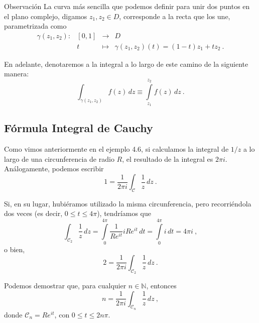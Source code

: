 \begin{obs}{Observación}
    La curva más sencilla que podemos definir para unir dos puntos en el plano complejo, digamos $z_1, z_2 \in D$, corresponde a la recta que los une, parametrizada como 
    \begin{equation}
        \begin{array}{crcl}
            \gamma(z_1, z_2): & [0,1] & \to & D \\
            & t & \mapsto & \gamma(z_1, z_2)(t) = (1-t)z_1 + tz_2 \ .
        \end{array}
    \end{equation}

    En adelante, denotaremos a la integral a lo largo de este camino de la siguiente manera:
    \begin{equation}
        \int_{\gamma(z_1, z_2)} f(z) \, dz \equiv \int\limits_{z_1}^{z_2} f(z) \, dz \ .
    \end{equation}
\end{obs}

\subsection{Fórmula Integral de Cauchy}

Como vimos anteriormente en el ejemplo 4.6, si calculamos la integral de $1/z$ a lo largo de una circunferencia de radio $R$, el resultado de la integral es $2 \pi i$. Análogamente, podemos escribir 
\begin{equation*}
    1 = \frac{1}{2\pi i} \int_{\mathcal{C}} \frac{1}{z} \, dz \ .
\end{equation*} 

Si, en su lugar, hubiéramos utilizado la misma circunferencia, pero recorriéndola dos veces (es decir, $0 \leq t \leq 4\pi$), tendríamos que
\begin{equation*}
    \int_{\mathcal{C}_2} \frac{1}{z} \, dz = \int\limits_0^{4\pi} \frac{1}{Re^{it}} i Re^{it} \, dt = \int\limits_0^{4\pi} i \, dt = 4\pi i \ , 
\end{equation*}
o bien,
\begin{equation*}
    2 = \frac{1}{2\pi i} \int_{\mathcal{C}_2} \frac{1}{z} \, dz \ .
\end{equation*}

Podemos demostrar que, para cualquier $n \in \mathbb{N}$, entonces
\begin{equation}
    n = \frac{1}{2\pi i} \int_{\mathcal{C}_n} \frac{1}{z} \, dz \ ,
\end{equation}
donde $\mathcal{C}_n = Re^{it}$, con $0 \leq t \leq 2n\pi$.

